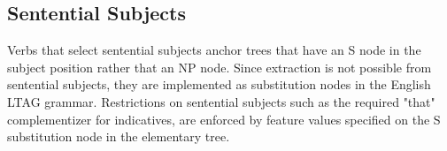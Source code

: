 \subsection{Sentential Subjects}

Verbs that select sentential subjects anchor trees that have an S node in the subject position rather that an NP node.  Since extraction is not possible from sentential subjects, they are implemented as substitution nodes in the English LTAG grammar.  Restrictions on sentential subjects such as the required "that" complementizer for indicatives, are enforced by feature values specified on the S substitution node in the elementary tree.  

